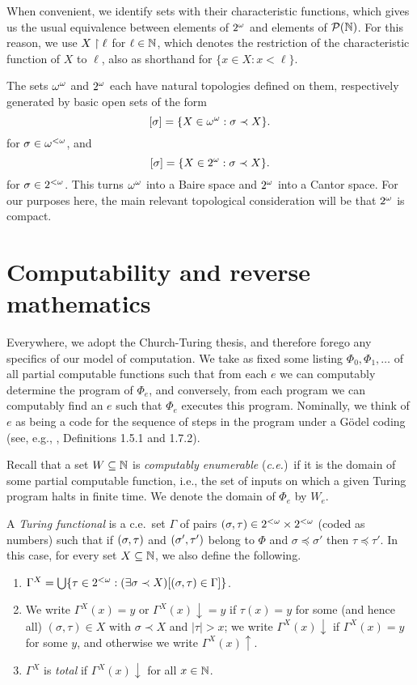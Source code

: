 \noindent When convenient, we identify sets with their characteristic functions, which gives us the usual equivalence between elements of ${2^{\omega}}$ and elements of $\mathcal{P}(\mathbb{N})$. For this reason, we use $X \upharpoonright \ell$ for $\ell \in \mathbb{N}$, which denotes the restriction of the characteristic function of $X$ to $\ell$, also as shorthand for $\{x \in X: x < \ell\}$. 

The sets ${\omega^{\omega}}$ and ${2^{\omega}}$ each have natural topologies defined on them, respectively generated by basic open sets of the form
\index{$[\sigma]$}
\[
	[\sigma] = \{X \in {\omega^{\omega}}: \sigma \prec X\}.
\]
for $\sigma \in {\omega^{<\omega}}$, and
\[
	[\sigma] = \{X \in {2^{\omega}}: \sigma \prec X\}.
\]
for $\sigma \in {2^{<\omega}}$. This turns ${\omega^{\omega}}$ into a Baire space and ${2^{\omega}}$ into a Cantor space. For our purposes here, the main relevant topological consideration will be that ${2^{\omega}}$ is compact.

\section{Computability and reverse mathematics}\label{sec:bkg_comp}

Everywhere, we adopt the Church-Turing thesis, and therefore forego any specifics of our model of computation. We take as fixed some listing $\Phi_0,\Phi_1,\ldots$ of all partial computable functions such that from each $e$ we can computably determine the program of $\Phi_e$, and conversely, from each program we can computably find an $e$ such that $\Phi_e$ executes this program. Nominally, we think of $e$ as being a code for the sequence of steps in the program under a G\"{o}del coding (see, e.g., \cite{Soare2016Turing}, Definitions 1.5.1 and 1.7.2).

Recall that a set $W \subseteq \mathbb{N}$ is \emph{computably enumerable} (\emph{c.e.})\ if it is the domain of some partial computable function, i.e., the set of inputs on which a given Turing program halts in finite time. We denote the domain of $\Phi_e$ by $W_e$.

\begin{definition}
	A \emph{Turing functional} is a c.e.\ set $\Gamma$ of pairs $( \sigma,\tau ) \in {2^{<\omega}} \times {2^{<\omega}}$ (coded as numbers) such that if $( \sigma,\tau )$ and $( \sigma',\tau' )$ belong to $\Phi$ and $\sigma \preceq \sigma'$ then $\tau \preceq \tau'$. In this case, for every set $X \subseteq \mathbb{N}$, we also define the following.
	\begin{enumerate}
		\item $\Gamma^X = \bigcup \{ \tau \in {2^{<\omega}}: (\exists \sigma \prec X)[(\sigma,\tau) \in \Gamma]\}$.
		\item We write $\Gamma^X(x) = y$ or $\Gamma^X(x) \downarrow = y$ if $\tau(x) = y$ for some (and hence all) $(\sigma,\tau) \in X$ with $\sigma \prec X$ and $|\tau| > x$; we write $\Gamma^X(x) \downarrow$ if $\Gamma^X(x) = y$ for some $y$, and otherwise we write $\Gamma^X(x) \uparrow$.
		\item $\Gamma^X$ is \emph{total} if $\Gamma^X(x) \downarrow$ for all $x \in \mathbb{N}$.
	\end{enumerate}
\end{definition}

